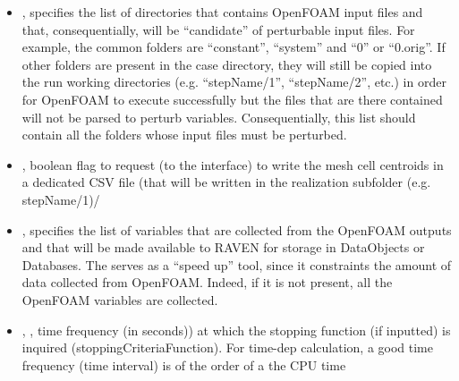 \begin{itemize}
   \item {},  specifies the  list of directories that contains OpenFOAM input files and that, consequentially, will be ``candidate'' of perturbable input files. For example,
                                                                             the common folders are ``constant'', ``system'' and ``0'' or ``0.orig''.
                                                                             \nb If other folders are present in the case directory, they will still be copied into the run working directories  (e.g. ``stepName/1'', ``stepName/2'', etc.) in order for 
                                                                                   OpenFOAM to execute successfully but the files that are there contained will not be parsed to perturb variables. Consequentially, this list should contain all the folders whose
                                                                                   input files must be perturbed.
    \item {},  boolean flag to request (to the interface) to write the mesh cell centroids in a dedicated CSV file (that will be written in the realization
                                                                                  subfolder (e.g. stepName/1)/                                                       
   \item {},  specifies the  list of variables that are collected from the OpenFOAM outputs and that will be made available to RAVEN for storage in DataObjects or Databases. 
                                                                      The   serves as a ``speed up'' tool, since it constraints the amount of data collected from OpenFOAM. Indeed, if it is not present, all the OpenFOAM variables are collected.
   \item {}, , time frequency (in seconds)) at which  the stopping function (if inputted)
                                                            is inquired (stoppingCriteriaFunction).
                                                            For time-dep calculation, a good time frequency (time interval) is of the order of a the CPU time

\end{itemize}

